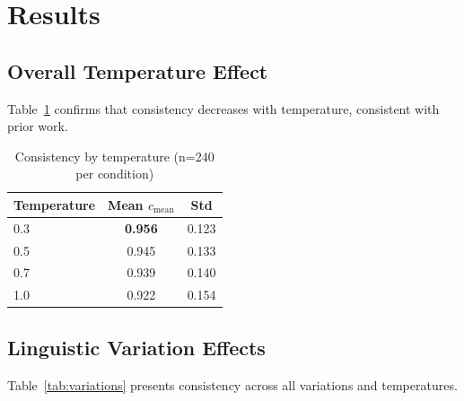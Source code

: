 \documentclass[11pt]{article}
\begin{document}
\section{Results}

\subsection{Overall Temperature Effect}

Table~\ref{tab:temperature} confirms that consistency decreases with temperature, consistent with prior work.

\begin{table}[h]
\centering
\begin{tabular}{lcc}
\toprule
Temperature & Mean $c_{\text{mean}}$ & Std \\
\midrule
0.3 & \textbf{0.956} & 0.123 \\
0.5 & 0.945 & 0.133 \\
0.7 & 0.939 & 0.140 \\
1.0 & 0.922 & 0.154 \\
\bottomrule
\end{tabular}
\caption{Consistency by temperature (n=240 per condition)}
\label{tab:temperature}
\end{table}

\subsection{Linguistic Variation Effects}

Table~\ref{tab:variations} presents consistency across all variations and temperatures.
\end{document}
